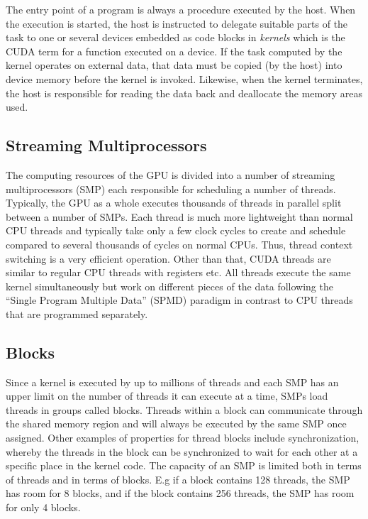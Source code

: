 The entry point of a program is always a procedure executed by the host. When the execution is started, the host is instructed to delegate suitable parts of the task to one or several devices embedded as code blocks in \emph{kernels} which is the CUDA term for a function executed on a device. If the task computed by the kernel operates on external data, that data must be copied (by the host) into device memory before the kernel is invoked. Likewise, when the kernel terminates, the host is responsible for reading the data back and deallocate the memory areas used.\\

\subsection{Streaming Multiprocessors}
The computing resources of the GPU is divided into a number of streaming multiprocessors (SMP) each responsible for scheduling a number of threads. Typically, the GPU as a whole executes thousands of threads in parallel split between a number of SMPs. Each thread is much more lightweight than normal CPU threads and typically take only a few clock cycles to create and schedule compared to several thousands of cycles on normal CPUs. Thus, thread context switching is a very efficient operation. Other than that, CUDA threads are similar to regular CPU threads with registers etc. All threads execute the same kernel simultaneously but work on different pieces of the data following the ``Single Program Multiple Data'' (SPMD) paradigm in contrast to CPU threads that are programmed separately. \\

\subsection{Blocks}
Since a kernel is executed by up to millions of threads and each SMP has an upper limit on the number of threads it can execute at a time, SMPs load threads in groups called blocks. Threads within a block can communicate through the shared memory region and will always be executed by the same SMP once assigned. Other examples of properties for thread blocks include synchronization, whereby the threads in the block can be synchronized to wait for each other at a specific place in the kernel code. The capacity of an SMP is limited both in terms of threads and in terms of blocks. E.g if a block contains 128 threads, the SMP has room for 8 blocks, and if the block contains 256 threads, the SMP has room for only 4 blocks.

